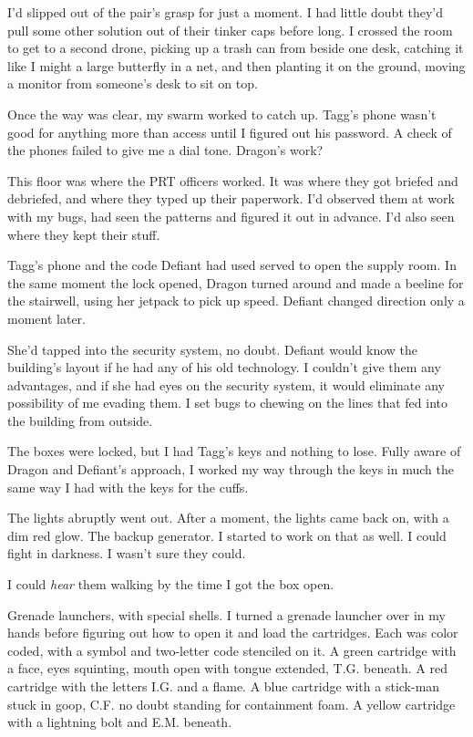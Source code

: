 I'd slipped out of the pair's grasp for just a moment.  I had little doubt they'd pull some other solution out of their tinker caps before long.  I crossed the room to get to a second drone, picking up a trash can from beside one desk, catching it like I might a large butterfly in a net, and then planting it on the ground, moving a monitor from someone's desk to sit on top.



Once the way was clear, my swarm worked to catch up.  Tagg's phone wasn't good for anything more than access until I figured out his password.  A check of the phones failed to give me a dial tone.  Dragon's work?



This floor was where the PRT officers worked.  It was where they got briefed and debriefed, and where they typed up their paperwork.  I'd observed them at work with my bugs, had seen the patterns and figured it out in advance.  I'd also seen where they kept their stuff.



Tagg's phone and the code Defiant had used served to open the supply room.  In the same moment the lock opened, Dragon turned around and made a beeline for the stairwell, using her jetpack to pick up speed.  Defiant changed direction only a moment later.



She'd tapped into the security system, no doubt.  Defiant would know the building's layout if he had any of his old technology.  I couldn't give them any advantages, and if she had eyes on the security system, it would eliminate any possibility of me evading them.  I set bugs to chewing on the lines that fed into the building from outside.



The boxes were locked, but I had Tagg's keys and nothing to lose.  Fully aware of Dragon and Defiant's approach, I worked my way through the keys in much the same way I had with the keys for the cuffs.



The lights abruptly went out.  After a moment, the lights came back on, with a dim red glow.  The backup generator.  I started to work on that as well.  I could fight in darkness.  I wasn't sure they could.



I could \emph{hear} them walking by the time I got the box open.



Grenade launchers, with special shells.  I turned a grenade launcher over in my hands before figuring out how to open it and load the cartridges.  Each was color coded, with a symbol and two-letter code stenciled on it.  A green cartridge with a face, eyes squinting, mouth open with tongue extended, T.G. beneath.  A red cartridge with the letters I.G. and a flame.  A blue cartridge with a stick-man stuck in goop, C.F. no doubt standing for containment foam.  A yellow cartridge with a lightning bolt and E.M. beneath.



